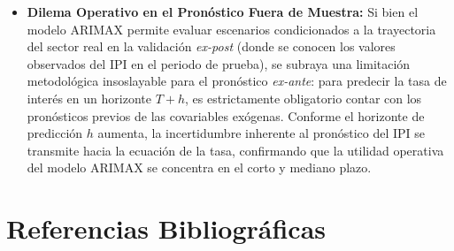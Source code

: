 \documentclass[11pt,letterpaper]{article}
\begin{document}
\begin{itemize}
    \item \textbf{Dilema Operativo en el Pronóstico Fuera de Muestra:} 
    Si bien el modelo ARIMAX permite evaluar escenarios condicionados a la trayectoria del sector real en la validación \textit{ex-post} (donde se conocen los valores observados del IPI en el periodo de prueba), se subraya una limitación metodológica insoslayable para el pronóstico \textit{ex-ante}: para predecir la tasa de interés en un horizonte $T+h$, es estrictamente obligatorio contar con los pronósticos previos de las covariables exógenas. Conforme el horizonte de predicción $h$ aumenta, la incertidumbre inherente al pronóstico del IPI se transmite hacia la ecuación de la tasa, confirmando que la utilidad operativa del modelo ARIMAX se concentra en el corto y mediano plazo.
\end{itemize}

\newpage
\section{Referencias Bibliográficas}
\end{document}

